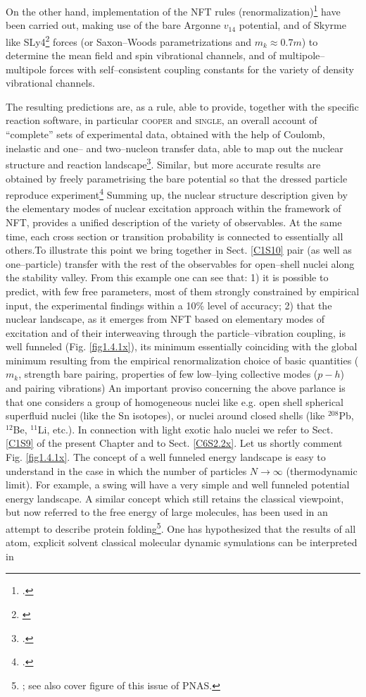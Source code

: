 On the other hand,  implementation of the NFT rules (renormalization)\footnote{\cite{Broglia:16}.} have been carried out, making use of the bare Argonne $v_{14}$ potential, and of Skyrme like SLy4\footnote{\cite{Chabanat:97}} forces (or Saxon--Woods parametrizations and $m_k\approx0.7 m$) to determine the mean field and spin vibrational channels, and of multipole--multipole forces with self--consistent  coupling constants for the variety of density vibrational channels.


The resulting predictions are, as a rule, able to provide, together with the specific reaction software, in particular \textsc{cooper} and \textsc{single}, an overall account of ``complete'' sets of experimental data, obtained with the help of Coulomb, inelastic and one-- and two--nucleon transfer data, able to map out the nuclear structure and reaction landscape\footnote{\cite{Idini:15,Idini:14,Potel:13}.}. Similar, but more accurate results are obtained by freely parametrising the bare potential so that the dressed particle reproduce experiment\footnote{\cite{Barranco:17}.}  Summing up, the nuclear structure description given by the elementary modes of nuclear excitation approach within the framework of NFT, provides a unified description of the variety of observables. At the same time, each cross section or transition probability is connected to essentially all others.To illustrate this point we  bring together  in Sect. \ref{C1S10} pair (as well as one--particle) transfer with the rest of the observables  for open--shell nuclei along the stability valley. From this example one can see that: 1) it is possible to predict, with few free parameters, most of them strongly constrained by empirical input, the experimental findings within a 10\% level of accuracy; 2) that the nuclear landscape, as it emerges from NFT based on elementary modes of excitation and of their interweaving through the particle--vibration coupling, is well funneled (Fig. \ref{fig1.4.1x}), its minimum essentially coinciding with the global minimum resulting from the empirical renormalization choice of basic quantities ($m_k$, strength bare pairing, properties of few low--lying collective modes ($p-h$) and pairing vibrations) An important proviso concerning the above parlance is that one considers a group of homogeneous nuclei like e.g. open shell spherical superfluid nuclei (like the Sn isotopes), or nuclei around closed shells (like $^{208}$Pb, $^{12}$Be, $^{11}$Li, etc.). In connection with light exotic halo nuclei we refer to Sect. \ref{C1S9} of the present Chapter and to Sect. \ref{C6S2.2x}. Let us shortly comment  Fig. \ref{fig1.4.1x}. The concept of a well funneled energy landscape  is easy to understand in the case in which the number of particles $N\rightarrow \infty$ (thermodynamic limit). For example, a swing will have a very simple and well funneled potential energy landscape. A similar concept which still retains the classical viewpoint, but now referred to the free energy of large molecules, has been used in an attempt to describe protein folding\footnote{\cite{Wolynes:16,Wolynes:12}; see also cover figure of this issue of PNAS.}. One has hypothesized that the results of all atom, explicit solvent classical molecular dynamic symulations can be interpreted in 